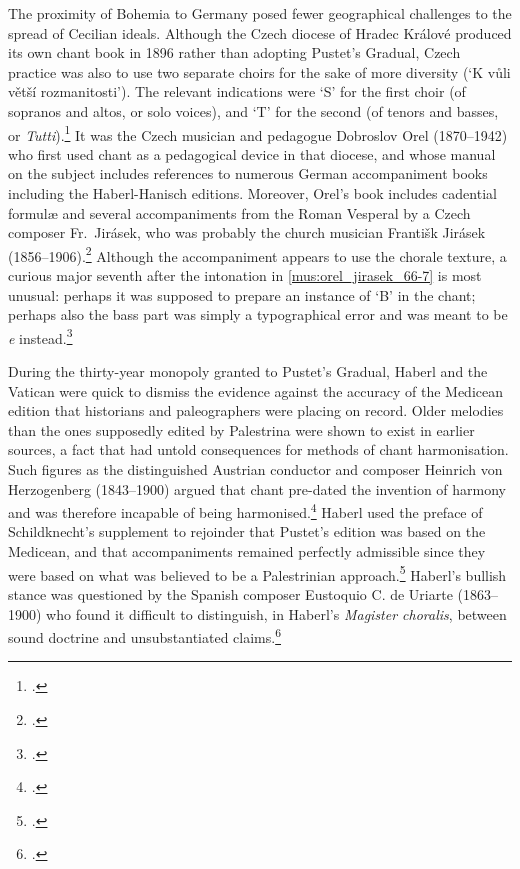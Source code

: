 The proximity of Bohemia to Germany posed fewer geographical challenges to the spread of Cecilian ideals.
Although the Czech diocese of Hradec Králové produced its own chant book in 1896 rather than adopting Pustet's Gradual, Czech practice was also to use two separate choirs for the sake of more diversity (`K vůli větší rozmanitosti').
The relevant indications were `S' for the first choir (of sopranos and altos, or solo voices), and `T' for the second  (of tenors and basses, or \emph{Tutti}).\footcite[324]{Oltarpoucnamodlitebni1896}
%
It was the Czech musician and pedagogue Dobroslov Orel (1870--1942) who first used chant as a pedagogical device in that diocese, and whose manual on the subject includes references to numerous German accompaniment books including the Haberl-Hanisch editions.
Moreover, Orel's book includes cadential formulæ and several accompaniments from the Roman Vesperal by a Czech composer Fr.~Jirásek, who was probably the church musician Františk Jirásek (1856--1906).\footcite[p.~96 n.~438, pp.~100--102]{AndrsovaDobroslavOreljeho2019}
Although the accompaniment appears to use the chorale texture, a curious major seventh after the intonation in \cref{mus:orel_jirasek_66-7} is most unusual: perhaps it was supposed to prepare an instance of `B'\kern 1pt\natural{} in the chant; perhaps also the bass part was simply a typographical error and was meant to be \emph{e} instead.\footcite[66--7]{OrelTheoretickopraktickarukovetchoralu1899}

During the thirty-year monopoly granted to Pustet's Gradual, Haberl and the Vatican were quick to dismiss the evidence against the accuracy of the Medicean edition that historians and paleographers were placing on record.
Older melodies than the ones supposedly edited by Palestrina were shown to exist in earlier sources, a fact that had untold consequences for methods of chant harmonisation.
Such figures as the distinguished Austrian conductor and composer Heinrich von Herzogenberg (1843--1900) argued that chant pre-dated the invention of harmony and was therefore incapable of being harmonised.\footcite[135--7]{HerzogenbergPielHarmonieLehre1890}
Haberl used the preface of Schildknecht's supplement to rejoinder that Pustet's edition was based on the Medicean, and that accompaniments remained perfectly admissible since they were based on what was believed to be a Palestrinian approach.\footcite[p.~iv]{SchildknechtOrganumcomitansad1892}
%
Haberl's bullish stance was questioned by the Spanish composer Eustoquio C. de Uriarte (1863--1900) who found it difficult to distinguish, in Haberl's \emph{Magister choralis}, between sound doctrine and unsubstantiated claims.\footcite[149]{UriarteTratadoteoricopracticocanto1890}

